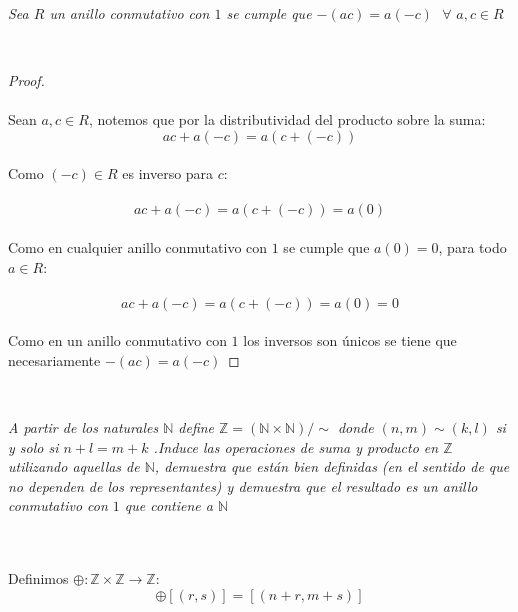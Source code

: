 \documentclass[11pt,letterpaper]{article}
\newcommand{\N}{\mathbb{N}}
\newcommand{\Z}{\mathbb{Z}}
\begin{document}
\,\\
\begin{tcolorbox}[
	title = \textcolor{black}{\textcolor{white}{Lema 1}},]
\textit{Sea $R$ un anillo conmutativo con $1$ se cumple que $-(ac)=a(-c)\,\,\,\,\forall\,\,a,c\in R$
}
\end{tcolorbox}\,\\
\begin{proof}\,\\
    \,\\
    Sean $a,c\in R$, notemos que por la distributividad del producto sobre la suma:\,\\
        \begin{equation*}
           ac+a(-c)=a(c+(-c))
        \end{equation*}\,\\
        Como $(-c)\in R$ es inverso para $c$:\,\\
        \,\\
        \begin{equation*}
            ac+a(-c)=a(c+(-c))=a(0)
        \end{equation*}\,\\
        Como en cualquier anillo conmutativo con $1$ se cumple que $a(0)=0$, para todo $a\in R$:\,\\
        \,\\
        \begin{equation*}
            ac+a(-c)=a(c+(-c))=a(0)=0
        \end{equation*}\,\\
        Como en un anillo conmutativo con $1$ los inversos son \'unicos se tiene que necesariamente $-(ac)=a(-c)$
\end{proof}\,\\
\newpage
\begin{tcolorbox}[
	title = \textcolor{black}{\textcolor{white}{Problema 1}},]
\textit{A partir de los naturales $\N$ define $\Z=(\N\times \N)/\sim$ donde $(n,m)\sim(k,l)$ si y solo si $n+l=m+k$
.Induce las operaciones de suma y producto en $\Z$ utilizando aquellas de $\N$, demuestra que est\'an bien definidas 
(en el sentido de que no dependen de los representantes) y demuestra que el resultado es un anillo conmutativo con $1$ que 
contiene  a $\N$ 
}
\end{tcolorbox}\,\\
    \,\\
    Definimos $\oplus:\Z\times \Z \rightarrow  \Z$:\,\\
    \begin{equation*}
        [(n,m)]\oplus[(r,s)]=[(n+r,m+s)]
    \end{equation*}\,\\
\end{document}

